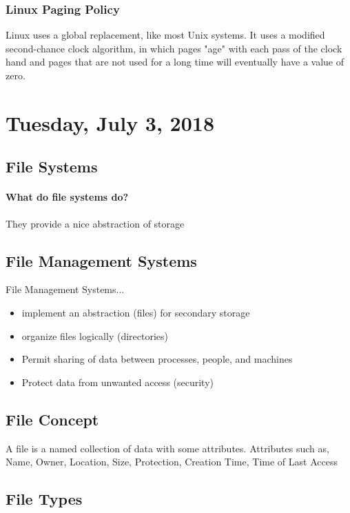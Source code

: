 \documentclass{article}
\begin{document}
\subsubsection{Linux Paging Policy}

Linux uses a global replacement, like most Unix systems. It uses a modified second-chance clock algorithm, in which pages "age" with each pass of the clock hand and pages that are not used for a long time will eventually have a value of zero.

\newpage

\section{Tuesday, July 3, 2018}




\subsection{File Systems}

\paragraph{What do file systems do?} They provide a nice abstraction of storage

\subsection{File Management Systems}

File Management Systems...
\begin{itemize}
    \item implement an abstraction (files) for secondary storage
    \item organize files logically (directories)
    \item Permit sharing of data between processes, people, and machines
    \item Protect data from unwanted access (security)
\end{itemize}

\subsection{File Concept}

A file is a named collection of data with some attributes. Attributes such as, Name, Owner, Location, Size, Protection, Creation Time, Time of Last Access

\subsection{File Types}
\end{document}
